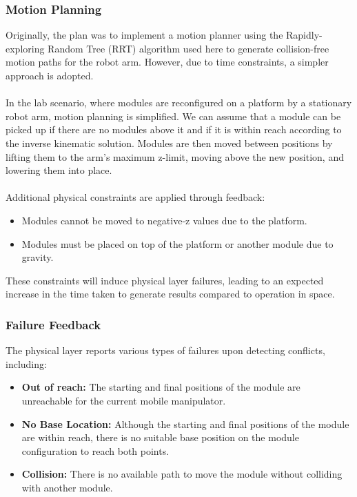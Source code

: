 \subsubsection{Motion Planning}
Originally, the plan was to implement a motion planner using the Rapidly-exploring Random Tree (RRT) algorithm used here \cite{8412538} to generate collision-free motion paths for the robot arm. However, due to time constraints, a simpler approach is adopted.
\\\\
In the lab scenario, where modules are reconfigured on a platform by a stationary robot arm, motion planning is simplified. We can assume that a module can be picked up if there are no modules above it and if it is within reach according to the inverse kinematic solution. Modules are then moved between positions by lifting them to the arm's maximum z-limit, moving above the new position, and lowering them into place.
\\\\
Additional physical constraints are applied through feedback:
\begin{itemize}[]
	\item Modules cannot be moved to negative-z values due to the platform.
	\item Modules must be placed on top of the platform or another module due to gravity.
\end{itemize}
These constraints will induce physical layer failures, leading to an expected increase in the time taken to generate results compared to operation in space.

\subsubsection{Failure Feedback}
The physical layer reports various types of failures upon detecting conflicts, including:
\begin{itemize}[]
	\item\textbf{Out of reach:} The starting and final positions of the module are unreachable for the current mobile manipulator.
	\item\textbf{No Base Location:} Although the starting and final positions of the module are within reach, there is no suitable base position on the module configuration to reach both points.
	\item\textbf{Collision:} There is no available path to move the module without colliding with another module.
\end{itemize}

